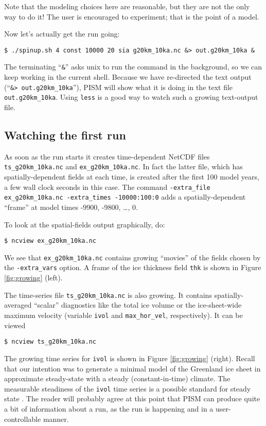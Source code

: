 Note that the modeling choices here are reasonable, but they are not the only way to do it! The user is encouraged to experiment; that is the point of a model.

Now let's actually get the run going:
\begin{verbatim}
$ ./spinup.sh 4 const 10000 20 sia g20km_10ka.nc &> out.g20km_10ka &
\end{verbatim}
\noindent The terminating ``\verb|&|'' asks unix to run the command in the background, so we can keep working in the current shell.  Because we have re-directed the text output (``\verb|&> out.g20km_10ka|''), PISM will show what it is doing in the text file \texttt{out.g20km_10ka}.  Using \texttt{less} is a good way to watch such a growing text-output file.


\subsection{Watching the first run}  \label{subsect:watchrun}  As soon as the run starts it creates time-dependent NetCDF files \texttt{ts_g20km_10ka.nc} and \texttt{ex_g20km_10ka.nc}.  In fact the latter file, which has spatially-dependent fields at each time, is created after the first 100 model years, a few wall clock seconds in this case.  The command \texttt{-extra_file ex_g20km_10ka.nc -extra_times -10000:100:0} adds a spatially-dependent ``frame'' at model times -9900, -9800, \dots, 0.

To look at the spatial-fields output graphically, do:
\begin{verbatim}
$ ncview ex_g20km_10ka.nc
\end{verbatim}
We see that \texttt{ex_g20km_10ka.nc} contains growing ``movies'' of the fields chosen by the \texttt{-extra_vars} option.  A frame of the ice thickness field \texttt{thk} is shown in Figure \ref{fig:growing} (left).

The time-series file \texttt{ts_g20km_10ka.nc} is also growing.  It contains spatially-averaged ``scalar'' diagnostics like the total ice volume or the ice-sheet-wide maximum velocity (variable \texttt{ivol} and \texttt{max_hor_vel}, respectively).  It can be viewed
\begin{verbatim}
$ ncview ts_g20km_10ka.nc
\end{verbatim}
The growing time series for \texttt{ivol} is shown in Figure \ref{fig:growing} (right).  Recall that our intention was to generate a minimal model of the Greenland ice sheet in approximate steady-state with a steady (constant-in-time) climate.  The measurable steadiness of the \texttt{ivol} time series is a possible standard for steady state \cite[for example]{EISMINT00}.  The reader will probably agree at this point that PISM can produce quite a bit of information about a run, as the run is happening and in a user-controllable manner.

